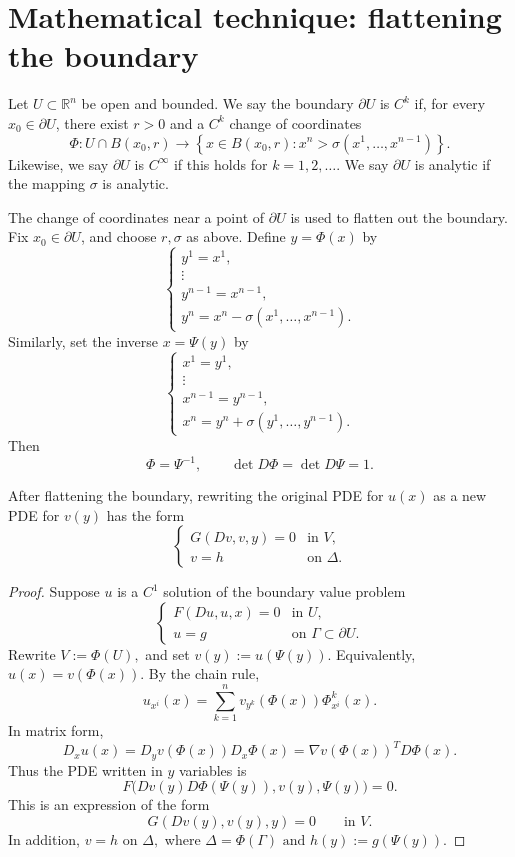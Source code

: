 \section{Mathematical technique: flattening the boundary}

\begin{definition}
Let $U\subset \mathbb{R}^n$ be open and bounded.
We say the boundary $\partial U$ is $C^k$ if, for every $x_0\in \partial U$, there exist $r>0$ and a $C^k$ change of coordinates
$$
\Phi:U\cap B(x_0,r)
\to
\left\{
x\in B(x_0,r): x^n>\sigma(x^1,\ldots,x^{n-1})
\right\}.
$$
Likewise, we say $\partial U$ is $C^\infty$ if this holds for $k=1,2,\ldots$.
We say $\partial U$ is analytic if the mapping $\sigma$ is analytic.
\end{definition}

\begin{definition}
The change of coordinates near a point of $\partial U$ is used to flatten out the boundary.
Fix $x_0\in \partial U$, and choose $r,\sigma$ as above. Define
$
y=\Phi(x)
$
by
$$
\begin{cases}
y^1=x^1,\\
\vdots\\
y^{n-1}=x^{n-1},\\
y^n=x^n-\sigma(x^1,\ldots,x^{n-1}).
\end{cases}
$$
Similarly, set the inverse
$
x=\Psi(y)
$
by
$$
\begin{cases}
x^1=y^1,\\
\vdots\\
x^{n-1}=y^{n-1},\\
x^n=y^n+\sigma(y^1,\ldots,y^{n-1}).
\end{cases}
$$
Then
$$
\Phi=\Psi^{-1},
\qquad
\det D\Phi=\det D\Psi=1.
$$
\end{definition}

\begin{claim}
After flattening the boundary, rewriting the original PDE for $u(x)$ as a new PDE for $v(y)$ has the form
$$
\begin{cases}
G(Dv,v,y)=0 & \text{in } V,\\
v=h & \text{on } \Delta.
\end{cases}
$$
\end{claim}

\begin{proof}
Suppose $u$ is a $C^1$ solution of the boundary value problem
$$
\begin{cases}
F(Du,u,x)=0 & \text{in } U,\\
u=g & \text{on } \Gamma\subset \partial U.
\end{cases}
$$
Rewrite
$
V:=\Phi(U),
$
and set
$
v(y):=u(\Psi(y)).
$
Equivalently,
$
u(x)=v(\Phi(x)).
$
By the chain rule,
$$
u_{x^i}(x)
=
\sum_{k=1}^n
v_{y^k}(\Phi(x))\Phi^k_{x^i}(x).
$$
In matrix form,
$$
D_xu(x)
=
D_yv(\Phi(x))D_x\Phi(x)
=
\nabla v(\Phi(x))^T D\Phi(x).
$$
Thus the PDE written in $y$ variables is
$$
F\bigl(Dv(y)D\Phi(\Psi(y)),v(y),\Psi(y)\bigr)=0.
$$
This is an expression of the form
$$
G(Dv(y),v(y),y)=0
\qquad \text{in } V.
$$
In addition,
$
v=h
\text{ on } \Delta,
$
where
$
\Delta=\Phi(\Gamma)
\text{ and }
h(y):=g(\Psi(y)).
$
\end{proof}


